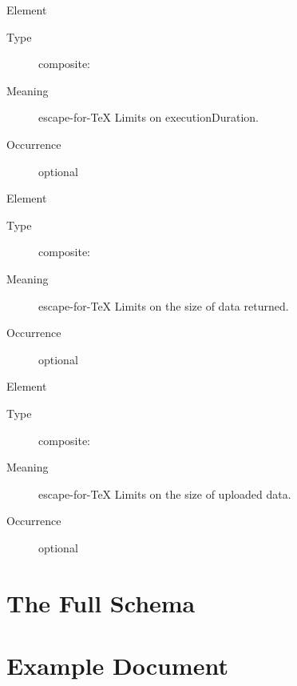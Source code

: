 \documentclass{ivoa}
\begin{document}
\begin{bigdescription}
\begin{description}
\end{description}
\item[Element \xmlel{executionDuration}]
\begin{description}
\item[Type] composite: 
\item[Meaning] escape-for-TeX{{{
              Limits on executionDuration.
              }}}
\item[Occurrence] optional

\end{description}
\item[Element \xmlel{outputLimit}]
\begin{description}
\item[Type] composite: 
\item[Meaning] escape-for-TeX{{{
              Limits on the size of data returned.
              }}}
\item[Occurrence] optional

\end{description}
\item[Element \xmlel{uploadLimit}]
\begin{description}
\item[Type] composite: 
\item[Meaning] escape-for-TeX{{{
              Limits on the size of uploaded data.
              }}}
\item[Occurrence] optional

\end{description}


\end{bigdescription}\endgroup

\endgroup

\appendix


\section{The Full Schema}

\label{app:fullschema}



\section{Example Document}

\label{app:example}
\end{document}
